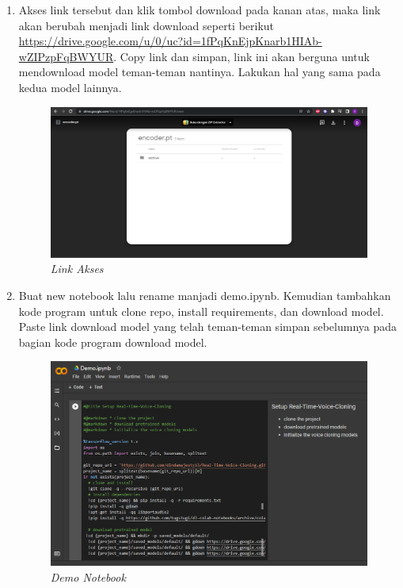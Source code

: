 \begin{enumerate}
\item Akses link tersebut dan klik tombol download pada kanan atas, maka link akan berubah menjadi link download seperti berikut \url{https://drive.google.com/u/0/uc?id=1fPqKnEjpKnarb1HIAb-wZIPzpFqBWYUR}. Copy link dan simpan, link ini akan berguna untuk mendownload model teman-teman nantinya. Lakukan hal yang sama pada kedua model lainnya.

\begin{figure}[H]
    \centering
    \includegraphics[scale=0.35]{figures/tutor4}
    \caption{\textit{Link Akses}}
    \label{tutor4}
\end{figure}


\item Buat new notebook lalu rename manjadi demo.ipynb. Kemudian tambahkan kode program untuk clone repo, install requirements, dan download model. Paste link download model yang telah teman-teman simpan sebelumnya pada bagian kode program download model.

\begin{figure}[H]
    \centering
    \includegraphics[scale=0.35]{figures/tutor1}
    \caption{\textit{Demo Notebook}}
    \label{tutor1}
\end{figure}


\end{enumerate}

